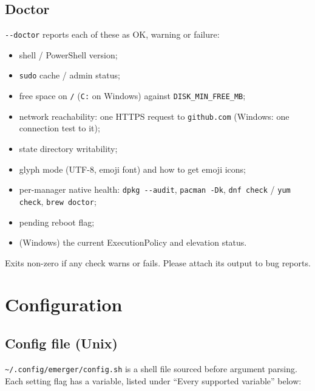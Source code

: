 \documentclass[11pt,a4paper]{article}
\begin{document}
\subsection{Doctor}
\texttt{-{}-doctor} reports each of these as OK, warning or failure:

\begin{itemize}
  \item shell / PowerShell version;
  \item \texttt{sudo} cache / admin status;
  \item free space on \texttt{/} (\texttt{C:} on Windows) against
        \texttt{DISK\_MIN\_FREE\_MB};
  \item network reachability: one HTTPS request to \texttt{github.com}
        (Windows: one connection test to it);
  \item state directory writability;
  \item glyph mode (UTF-8, emoji font) and how to get emoji icons;
  \item per-manager native health: \texttt{dpkg -{}-audit},
        \texttt{pacman -Dk}, \texttt{dnf check} / \texttt{yum check},
        \texttt{brew doctor};
  \item pending reboot flag;
  \item (Windows) the current ExecutionPolicy and elevation status.
\end{itemize}

Exits non-zero if any check warns or fails. Please attach its output to
bug reports.

\section{Configuration}\label{sec:config}

\subsection{Config file (Unix)}

\verb|~/.config/emerger/config.sh| is a shell file sourced before
argument parsing. Each setting flag has a variable, listed under
``Every supported variable'' below:
\end{document}
